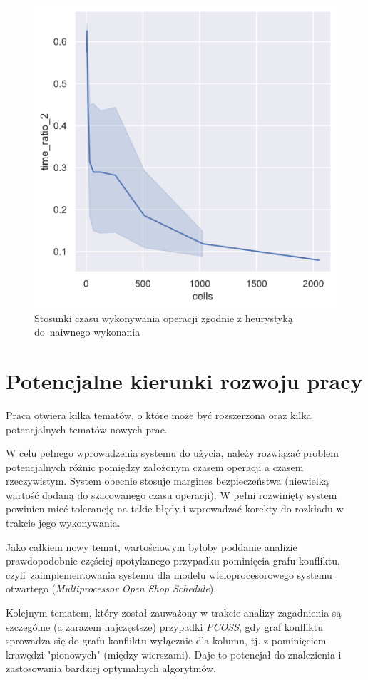 \documentclass[brudnopis]{xmgr}
\begin{document}
\begin{figure}[!tbh]
\centering
\includegraphics[width=.7\hsize]{fig/time_ratio_2.png}
\caption{Stosunki czasu wykonywania operacji zgodnie z heurystyką do~naiwnego wykonania \label{diag:time_ratio_2}}
\end{figure}\medskip



\chapter{Potencjalne kierunki rozwoju pracy} \label{chap:extend}

Praca otwiera kilka tematów, o które może być rozszerzona oraz kilka potencjalnych tematów nowych prac.
\medskip

W celu pełnego wprowadzenia systemu do użycia, należy rozwiązać problem potencjalnych różnic pomiędzy założonym czasem operacji a czasem rzeczywistym. System obecnie stosuje margines bezpieczeństwa (niewielką wartość dodaną do szacowanego czasu operacji).
W pełni rozwinięty system powinien mieć tolerancję na takie błędy i wprowadzać korekty do rozkładu w trakcie jego wykonywania.
\medskip

Jako całkiem nowy temat, wartościowym byłoby poddanie analizie prawdopodobnie częściej spotykanego przypadku pominięcia grafu konfliktu, czyli~zaimplementowania systemu dla modelu wieloprocesorowego systemu otwartego (\emph{Multiprocessor Open Shop Schedule}).
\medskip

Kolejnym tematem, który został zauważony w trakcie analizy zagadnienia są szczególne (a zarazem najczęstsze) przypadki \emph{PCOSS}, gdy graf konfliktu sprowadza się do grafu konfliktu wyłącznie dla kolumn, tj. z pominięciem krawędzi "pionowych" (między wierszami). Daje to potencjał do znalezienia i zastosowania bardziej optymalnych algorytmów.
\medskip
\end{document}

